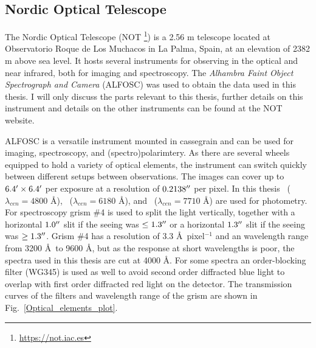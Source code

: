 \documentclass[a4paper,oneside,12pt, class=Latex/Classes/PhDthesisPSnPDF, crop=false]{standalone}
\begin{document}
\subsection{Nordic Optical Telescope}
\label{NOT}
The Nordic Optical Telescope (NOT \footnote{\url{https://not.iac.es}}) is a 2.56 m telescope located at Observatorio Roque de Los Muchacos in La Palma, Spain, at an elevation of 2382 m above sea level. It hosts several instruments for observing in the optical and near infrared, both for imaging and spectroscopy. The \textit{Alhambra Faint Object Spectrograph and Camera} (ALFOSC) was used to obtain the data used in this thesis. I will only discuss the parts relevant to this thesis, further details on this instrument and  details on the other instruments can be found at the NOT website.

ALFOSC is a versatile instrument mounted in cassegrain and can be used for imaging, spectroscopy, and (spectro)polarimtery. As there are several wheels equipped to hold a variety of optical elements, the instrument can switch quickly between different setups between observations. The images can cover up to $6.4^{\prime}\times6.4^{\prime}$ per exposure at a resolution of $0.2138^{\prime\prime}$ per pixel. In this thesis \ztfg~($\lambda_{cen} = 4800$ \AA), \ztfr~($\lambda_{cen} = 6180$ \AA), and \ztfi~($\lambda_{cen} = 7710$ \AA) are used for photometry. For spectroscopy grism \#4 is used to split the light vertically, together with a horizontal $1.0^{\prime\prime}$ slit if the seeing was $\leq1.3^{\prime\prime}$ or a horizontal $1.3^{\prime\prime}$ slit if the seeing was $\geq1.3^{\prime\prime}$. Grism \#4 has a resolution of 3.3 \AA\ pixel$^{-1}$ and an wavelength range from 3200 \AA\ to 9600 \AA, but as the response at short wavelengths is poor, the spectra used in this thesis are cut at 4000 \AA. For some spectra an order-blocking filter (WG345) is used as well to avoid second order diffracted blue light to overlap with first order diffracted red light on the detector. The transmission curves of the filters and wavelength range of the grism are shown in Fig.~\ref{Optical_elements_plot}.
\end{document}
